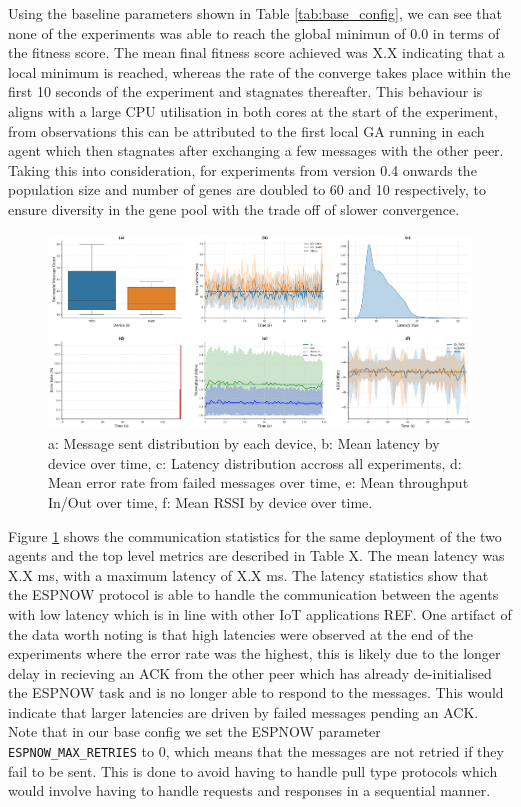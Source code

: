 \documentclass[conference]{IEEEtran}
\begin{document}
Using the baseline parameters shown in Table \ref{tab:base_config}, we can see that none of the experiments was able to reach the global minimun of 0.0 in terms of the fitness score. The mean final fitness score achieved was X.X indicating that a local minimum is reached, whereas the rate of the converge takes place within the first 10 seconds of the experiment and stagnates thereafter. This behaviour is aligns with a large CPU utilisation in both cores at the start of the experiment, from observations this can be attributed to the first local GA running in each agent which then stagnates after exchanging a few messages with the other peer. Taking this into consideration, for experiments from version 0.4 onwards the population size and number of genes are doubled to 60 and 10 respectively, to ensure diversity in the gene pool with the trade off of slower convergence.\\

\begin{figure}[b]
  \centering
  \includegraphics[width=1\textwidth]{base_comm_stats.pdf}
  \caption{a: Message sent distribution by each device,  b: Mean latency by device over time, c: Latency distribution accross all experiments, d: Mean error rate from failed messages over time, e: Mean throughput In/Out over time, f: Mean RSSI by device over time.}
  \label{fig:base_comm_stats}
\end{figure}

Figure \ref{fig:base_comm_stats} shows the communication statistics for the same deployment of the two agents and the top level metrics are described in Table X. The mean latency was X.X ms, with a maximum latency of X.X ms. The latency statistics show that the ESPNOW protocol is able to handle the communication between the agents with low latency which is in line with other IoT applications REF. One artifact of the data worth noting is that high latencies were observed at the end of the experiments where the error rate was the highest, this is likely due to the longer delay in recieving an ACK from the other peer which has already de-initialised the ESPNOW task and is no longer able to respond to the messages. This would indicate that larger latencies are driven by failed messages pending an ACK. Note that in our base config we set the ESPNOW parameter \texttt{ESPNOW\_MAX\_RETRIES} to 0, which means that the messages are not retried if they fail to be sent. This is done to avoid having to handle pull type protocols which would involve having to handle requests and responses in a sequential manner.\\
\end{document}
